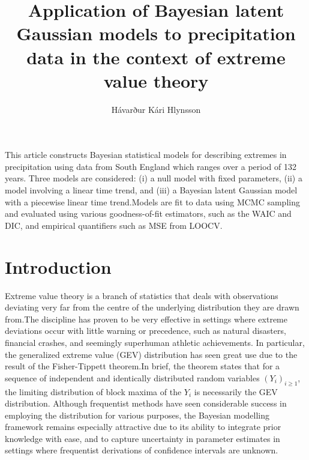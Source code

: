 \documentclass[12pt, a4paper]{article}
\title{Application of Bayesian latent Gaussian models to
       precipitation data in the context of extreme value theory}
\author{Hávarður Kári Hlynsson}
\date{}
\renewenvironment{abstract}
 {\small
  \begin{center}
  \bfseries \abstractname\vspace{-.5em}\vspace{0pt}
  \end{center}
  \list{}{%
    \setlength{\leftmargin}{20mm}
    \setlength{\rightmargin}{\leftmargin}%
  }%
  \item\relax}
 {\endlist}
\begin{document}
  
  \maketitle
  
  \begin{abstract}
    This article constructs Bayesian statistical models for describing extremes
    in precipitation using data from South England which ranges over a period
    of 132 years. Three models are considered: (i)
    a null model with fixed parameters, (ii) a model involving a linear time
    trend, and (iii) a Bayesian latent Gaussian model with a piecewise linear
    time trend.\@ Models are fit to data using MCMC sampling and evaluated
    using various goodness-of-fit estimators, such as the WAIC and DIC, and
    empirical quantifiers such as MSE from LOOCV.
  \end{abstract}

  \section{Introduction}
  Extreme value theory is a branch of statistics that deals with observations
  deviating very far from the centre of the underlying distribution they are
  drawn from.\@ The discipline has proven to be very effective in settings 
  where extreme deviations occur with little warning or precedence, such as
  natural disasters, financial crashes, and seemingly superhuman athletic
  achievements. In particular, the generalized extreme value (GEV) distribution
  has seen great use due to the result of the Fisher-Tippett theorem.\@ In
  brief, the theorem states that for a sequence of independent and identically
  distributed random variables \((Y_i)_{i \geq 1}\), the limiting distribution
  of block maxima of the \(Y_i\) is necessarily the GEV distribution.\@
  Although frequentist methods have seen considerable success in employing the
  distribution for various purposes, the Bayesian modelling framework remains
  especially attractive due to its ability to integrate prior knowledge with
  ease, and to capture uncertainty in parameter estimates in settings where
  frequentist derivations of confidence intervals are unknown.
\end{document}
